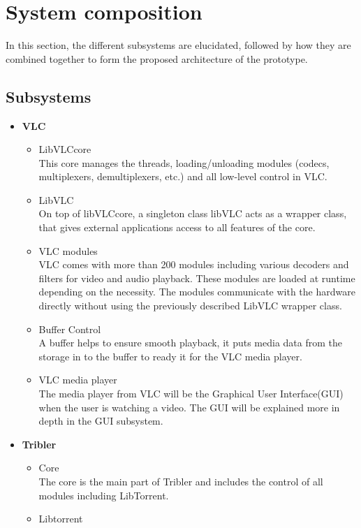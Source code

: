 \section{System composition}
In this section, the different subsystems are elucidated, followed by how they are combined together to form the proposed architecture of the prototype.
\subsection{Subsystems}
\begin{itemize}
\item \textbf{VLC}
	\begin{itemize}
		\item LibVLCcore\\
This core manages the threads, loading/unloading modules (codecs, multiplexers, demultiplexers, etc.) and all low-level control in VLC.
		\item LibVLC\\
On top of libVLCcore, a singleton class libVLC acts as a wrapper class, that gives external applications access to all features of the core.
		\item VLC modules\\
VLC comes with more than 200 modules including various decoders and filters for video and audio playback. These modules are loaded at runtime depending on the necessity. The modules communicate with the hardware directly without using the previously described LibVLC wrapper class.
		\item Buffer Control\\
A buffer helps to ensure smooth playback, it puts media data from the storage in to the buffer to ready it for the VLC media player.
		\item VLC media player\\
The media player from VLC will be the Graphical User Interface(GUI) when the user is watching a video. The GUI will be explained more in depth in the GUI subsystem.
	\end{itemize}
\item \textbf{Tribler}
	\begin{itemize}
		\item Core\\
The core is the main part of Tribler and includes the control of all modules including LibTorrent.
		\item Libtorrent\\

\end{itemize}
\end{itemize}
